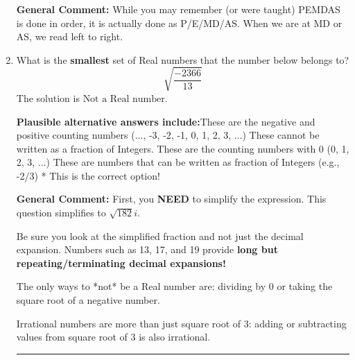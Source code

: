 \documentclass{extbook}[14pt]
\newcommand{\litem}[1]{\item #1

\rule{\textwidth}{0.4pt}}
\begin{document}
\begin{enumerate}
{\textbf{General Comment:} While you may remember (or were taught) PEMDAS is done in order, it is actually done as P/E/MD/AS. When we are at MD or AS, we read left to right.
}
\litem{
What is the \textbf{smallest} set of Real numbers that the number below belongs to?
\[ \sqrt{\frac{-2366}{13}} \]The solution is \( \text{Not a Real number} \).\begin{enumerate}[label=\Alph*.]
\textbf{Plausible alternative answers include:}These are the negative and positive counting numbers (..., -3, -2, -1, 0, 1, 2, 3, ...)
These cannot be written as a fraction of Integers.
These are the counting numbers with 0 (0, 1, 2, 3, ...)
These are numbers that can be written as fraction of Integers (e.g., -2/3)
* This is the correct option!
\end{enumerate}

\textbf{General Comment:} First, you \textbf{NEED} to simplify the expression. This question simplifies to $\sqrt{182} i$. 
 
 Be sure you look at the simplified fraction and not just the decimal expansion. Numbers such as 13, 17, and 19 provide \textbf{long but repeating/terminating decimal expansions!} 
 
 The only ways to *not* be a Real number are: dividing by 0 or taking the square root of a negative number. 
 
 Irrational numbers are more than just square root of 3: adding or subtracting values from square root of 3 is also irrational.
}
\end{enumerate}
\end{document}
